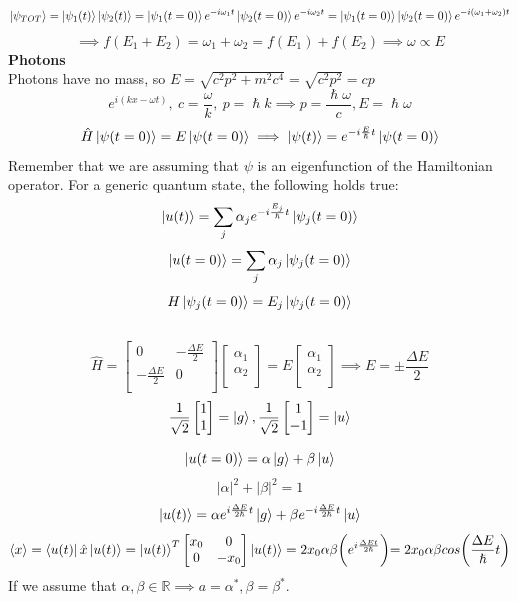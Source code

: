 \documentclass{article}
\begin{document}
$$\ket{\psi_{TOT}} = \ket{\psi_1(t)}\ket{\psi_2(t)} = \ket{\psi_1(t=0)}e^{-i\omega_1t}\ket{\psi_2(t=0)}e^{-i\omega_2 t} = \ket{\psi_1(t=0)}\ket{\psi_2(t=0)}e^{-i(\omega_1+\omega_2)t}$$
$$\implies f(E_1+E_2) = \omega_1 + \omega_2 = f(E_1)+ f(E_2) \implies \omega \varpropto E$$
\textbf{Photons} \\
Photons have no mass, so $E = \sqrt{c^2p^2+m^2c^4} = \sqrt{c^2p^2} = cp$
$$e^{i(kx-\omega t)}, \ c = \frac{\omega}{k}, \ p = \hslash k \implies p =  \frac{\hslash\omega}{c}, E = \hslash \omega$$
$$\hat{H}\ket{\psi(t=0)} = E \ket{\psi(t=0)}  \implies \ket{\psi(t)} = e^{-i\frac{E}{\hslash}t} \ket{\psi(t=0)}$$
Remember that we are assuming that $\psi$ is an eigenfunction of the Hamiltonian operator.
For a generic quantum state, the following holds true:
$$\ket{u(t)} = \sum_j \alpha_j e^{-i\frac{E_j}{\hslash}t} \ket{\psi_j(t=0)}$$
$$\ket{u(t=0)} = \sum_j \alpha_j \ket{\psi_j(t=0)}$$
$$H\ket{\psi_j(t=0)} = E_j \ket{\psi_j(t=0)}$$ \\ 
$$\hat{H} = \begin{bmatrix}
    0 & -\frac{\Delta E}{2} \\
    -\frac{\Delta E}{2} & 0 \\
\end{bmatrix} \begin{bmatrix}
    \alpha_1  \\
      \alpha_2 \\
\end{bmatrix} = E \begin{bmatrix}
    \alpha_1  \\
      \alpha_2 \\
\end{bmatrix} \implies E = \pm \frac{\Delta E}{2}$$ 
$$\frac{1}{\sqrt{2}}  \begin{bmatrix}
    1 \\
    1 \\
\end{bmatrix} = \ket{g}, \frac{1}{\sqrt{2}} \begin{bmatrix}
    1 \\
    -1 \\
\end{bmatrix} = \ket{u}$$

$$\ket{u(t=0)} = \alpha \ket{g} + \beta \ket{u}$$
$$|\alpha|^2+|\beta|^2 = 1$$
$$\ket{u(t)}= \alpha e^{i \frac{\Delta E}{2 \hslash}t} \ket{g}+ \beta e^{-i \frac{\Delta E}{2 \hslash}t} \ket{u}$$
$$\langle x \rangle  = \bra{u(t)} \hat{x} \ket{u(t)} =\ket{u(t)}^T \begin{bmatrix}
    x_0 & 0 \\
    0 & -x_0 \\
\end{bmatrix} \ket{u(t)} =2 x_0 \alpha \beta \biggl( e^{i \frac{\Delta E t}{2 \hslash}} \biggl) =2 x_0 \alpha \beta cos\biggl(\frac{\Delta E}{\hslash}t\biggl)$$
If we assume that $\alpha, \beta \in \mathbb{R} \implies a = \alpha^*, \beta = \beta^*$. 
\end{document}
